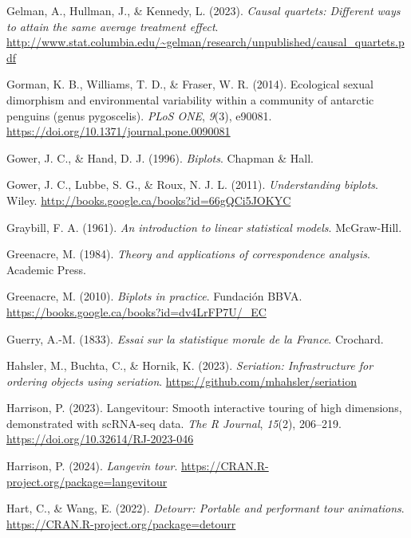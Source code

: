 \documentclass[
  letterpaper,
  10pt,
  krantz2]{krantz}
\newlength{\cslhangindent}
\newenvironment{CSLReferences}[2] %
 {\begin{list}{}{%
  \setlength{\itemindent}{0pt}
  \setlength{\leftmargin}{0pt}
  \setlength{\parsep}{0pt}
  \ifodd #1
   \setlength{\leftmargin}{\cslhangindent}
   \setlength{\itemindent}{-1\cslhangindent}
  \fi
  \setlength{\itemsep}{#2\baselineskip}}}
 {\end{list}}
\begin{document}
\begin{CSLReferences}{1}{0}
Gelman, A., Hullman, J., \& Kennedy, L. (2023). \emph{Causal quartets:
Different ways to attain the same average treatment effect}.
\url{http://www.stat.columbia.edu/~gelman/research/unpublished/causal_quartets.pdf}

Gorman, K. B., Williams, T. D., \& Fraser, W. R. (2014). Ecological
sexual dimorphism and environmental variability within a community of
antarctic penguins (genus pygoscelis). \emph{{PLoS} {ONE}}, \emph{9}(3),
e90081. \url{https://doi.org/10.1371/journal.pone.0090081}

Gower, J. C., \& Hand, D. J. (1996). \emph{Biplots}. Chapman \& Hall.

Gower, J. C., Lubbe, S. G., \& Roux, N. J. L. (2011).
\emph{Understanding biplots}. Wiley.
\url{http://books.google.ca/books?id=66gQCi5JOKYC}

Graybill, F. A. (1961). \emph{An introduction to linear statistical
models}. McGraw-Hill.

Greenacre, M. (1984). \emph{Theory and applications of correspondence
analysis}. Academic Press.

Greenacre, M. (2010). \emph{Biplots in practice}. Fundaci{ó}n BBVA.
\url{https://books.google.ca/books?id=dv4LrFP7U/_EC}

Guerry, A.-M. (1833). \emph{Essai sur la statistique morale de la
{France}}. Crochard.

Hahsler, M., Buchta, C., \& Hornik, K. (2023). \emph{Seriation:
Infrastructure for ordering objects using seriation}.
\url{https://github.com/mhahsler/seriation}

Harrison, P. (2023). Langevitour: Smooth interactive touring of high
dimensions, demonstrated with scRNA-seq data. \emph{The R Journal},
\emph{15}(2), 206--219. \url{https://doi.org/10.32614/RJ-2023-046}

Harrison, P. (2024). \emph{Langevin tour}.
\url{https://CRAN.R-project.org/package=langevitour}

Hart, C., \& Wang, E. (2022). \emph{Detourr: Portable and performant
tour animations}. \url{https://CRAN.R-project.org/package=detourr}


\end{CSLReferences}
\end{document}

